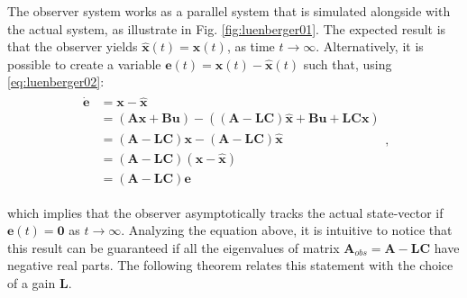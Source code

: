 \documentclass[a4paper,11pt]{book}
\numberwithin{figure}{chapter}
\numberwithin{equation}{chapter}
\numberwithin{table}{chapter}
\theoremstyle{definition}
\begin{document}
The observer system works as a parallel system that is simulated alongside with the actual system, as illustrate in Fig. \ref{fig:luenberger01}. The expected result is that the observer yields $\hat{\bm{x}}(t) = \bm{x}(t)$, as time $t \to \infty$. Alternatively, it is possible to create a variable $\bm{e}(t) = \bm{x}(t) - \hat{\bm{x}}(t)$ such that, using \eqref{eq:luenberger02}:
\begin{align}
\begin{split}
    \dot{\bm{e}} &= \bm{x} - \hat{\bm{x}} \\ 
        &= \left( \bm{A} \bm{x} + \bm{B} \bm{u} \right) - \left( \left( \bm{A} - \bm{L} \bm{C} \right) \hat{\bm{x}} + \bm{B} \bm{u} + \bm{L} \bm{C} \bm{x} \right) \\
        &= \left( \bm{A} - \bm{L} \bm{C} \right) \bm{x} - \left( \bm{A} - \bm{L} \bm{C} \right) \hat{\bm{x}} \\
        &= \left( \bm{A} - \bm{L} \bm{C} \right) \left( \bm{x} - \hat{\bm{x}} \right) \\
        &= \left( \bm{A} - \bm{L} \bm{C} \right) \bm{e}
\end{split}
,\end{align}

\noindent which implies that the observer asymptotically tracks the actual state-vector if $\bm{e}(t) = \bm{0}$ as $t \to \infty$. Analyzing the equation above, it is intuitive to notice that this result can be guaranteed if all the eigenvalues of matrix $\bm{A}_{obs} = \bm{A} - \bm{L} \bm{C}$ have negative real parts. The following theorem relates this statement with the choice of a gain $\bm{L}$.
\end{document}
